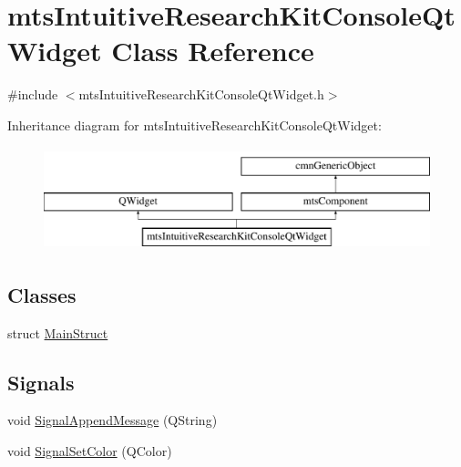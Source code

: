 \hypertarget{classmts_intuitive_research_kit_console_qt_widget}{\section{mts\-Intuitive\-Research\-Kit\-Console\-Qt\-Widget Class Reference}
\label{classmts_intuitive_research_kit_console_qt_widget}
}


{\ttfamily \#include $<$mts\-Intuitive\-Research\-Kit\-Console\-Qt\-Widget.\-h$>$}

Inheritance diagram for mts\-Intuitive\-Research\-Kit\-Console\-Qt\-Widget\-:\begin{figure}[H]
\begin{center}
\leavevmode
\includegraphics[height=3.000000cm]{db/d8b/classmts_intuitive_research_kit_console_qt_widget}
\end{center}
\end{figure}
\subsection*{Classes}
\begin{DoxyCompactItemize}
\item 
struct \hyperlink{structmts_intuitive_research_kit_console_qt_widget_1_1_main_struct}{Main\-Struct}
\end{DoxyCompactItemize}
\subsection*{Signals}
\begin{DoxyCompactItemize}
\item 
void \hyperlink{classmts_intuitive_research_kit_console_qt_widget_a8b2a92a9c140b8022613cf9ff86af71a}{Signal\-Append\-Message} (Q\-String)
\item 
void \hyperlink{classmts_intuitive_research_kit_console_qt_widget_a08dbe41b123cb8cebf7695e0190b3a56}{Signal\-Set\-Color} (Q\-Color)
\end{DoxyCompactItemize}
